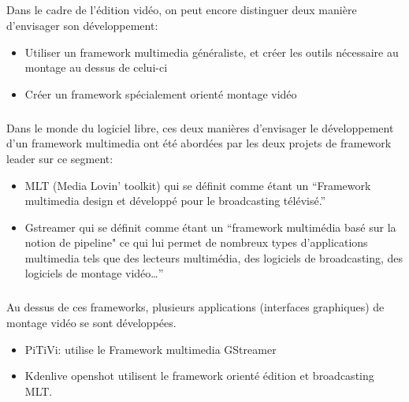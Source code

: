 \subparagraph{}

Dans le cadre de l'édition vidéo, on peut encore distinguer deux
manière d'envisager son développement:

\begin {itemize}

  \item {Utiliser un framework multimedia généraliste, et créer les
  outils nécessaire
         au montage au dessus de celui-ci} %

  \item {Créer un framework spécialement orienté montage vidéo}

\end {itemize}

\subparagraph{}

Dans le monde du logiciel libre, ces deux manières d'envisager le
développement d'un framework multimedia ont été abordées par les
deux projets de framework leader sur ce segment:

\begin {itemize}

  \item {MLT (Media Lovin' toolkit) qui se définit comme
  étant un ``Framework multimedia design
    et développé pour le broadcasting télévisé.''}

  \item {Gstreamer qui se définit comme étant un ``framework multimédia
    basé sur la notion de pipeline" ce qui lui permet de nombreux types
    d'applications multimedia tels que des lecteurs multimédia, des
    logiciels de broadcasting, des logiciels de montage vidéo\ldots''}

\end {itemize}

\subparagraph {}

Au dessus de ces frameworks, plusieurs applications (interfaces
graphiques) de montage vidéo se sont développées.

\begin {itemize}

  \item {PiTiVi: utilise le Framework multimedia GStreamer}

  \item {Kdenlive openshot utilisent le framework
  orienté édition et broadcasting MLT.}

\end {itemize}


